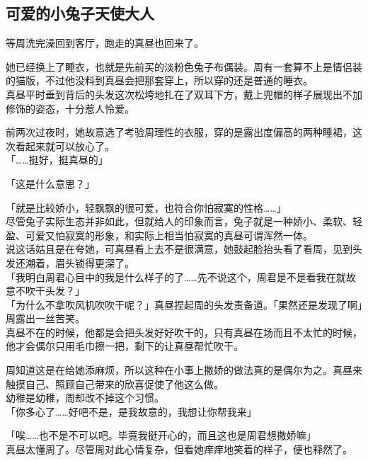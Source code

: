\subsection{可爱的小兔子天使大人}

等周洗完澡回到客厅，跑走的真昼也回来了。

她已经换上了睡衣，也就是先前买的淡粉色兔子布偶装。周有一套算不上是情侣装的猫版，不过他没料到真昼会把那套穿上，所以穿的还是普通的睡衣。\\

真昼平时垂到背后的头发这次松垮地扎在了双耳下方，戴上兜帽的样子展现出不加修饰的姿态，十分惹人怜爱。

前两次过夜时，她故意选了考验周理性的衣服，穿的是露出度偏高的两种睡裙，这次看起来就可以放心了。\\

「……挺好，挺真昼的」

「这是什么意思？」

「就是比较娇小，轻飘飘的很可爱，也符合你怕寂寞的性格……」\\

尽管兔子实际生态并非如此，但就给人的印象而言，兔子就是一种娇小、柔软、轻盈、可爱又怕寂寞的形象，和实际上相当怕寂寞的真昼可谓浑然一体。\\

说这话姑且是在夸她，可真昼看上去不是很满意，她鼓起脸抬头看了看周，见到头发还潮着，眉头锁得更深了。\\

「我明白周君心目中的我是什么样子的了……先不说这个，周君是不是看我在就故意不吹干头发？」\\

「为什么不拿吹风机吹吹干呢？」真昼捏起周的头发责备道。「果然还是发现了啊」周露出一丝苦笑。\\

真昼不在的时候，他都是会把头发好好吹干的，只有真昼在场而且不太忙的时候，他才会偶尔只用毛巾擦一把，剩下的让真昼帮忙吹干。

周知道这是在给她添麻烦，所以这种在小事上撒娇的做法真的是偶尔为之。真昼来触摸自己、照顾自己带来的欣喜促使了他这么做。\\

幼稚是幼稚，周却改不掉这个习惯。\\

「你多心了……好吧不是，是我故意的，我想让你帮我来」

「唉……也不是不可以吧。毕竟我挺开心的，而且这也是周君想撒娇嘛」\\

真昼太懂周了。尽管周对此心情复杂，但看她痒痒地笑着的样子，便也释然了。\\


